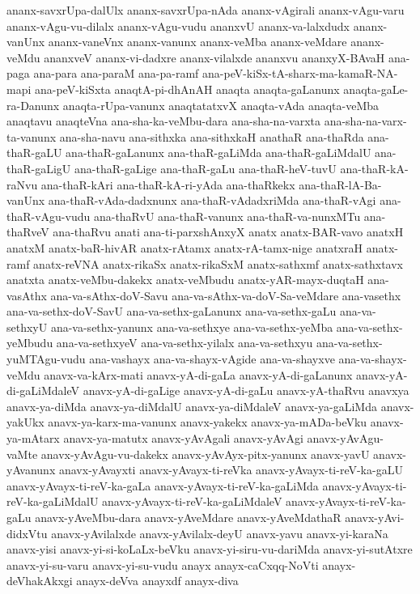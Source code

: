 {ananx-savxrUpa-dalUlx
ananx-savxrUpa-nAda
ananx-vAgirali
ananx-vAgu-varu
ananx-vAgu-vu-dilalx
ananx-vAgu-vudu
ananxvU
ananx-va-lalxdudx
ananx-vanUnx
ananx-vaneVnx
ananx-vanunx
ananx-veMba
ananx-veMdare
ananx-veMdu
ananxveV
ananx-vi-dadxre
ananx-vilalxde
ananxvu
ananxyX-BAvaH
ana-paga
ana-para
ana-paraM
ana-pa-ramf
ana-peV-kiSx-tA-sharx-ma-kamaR-NA-mapi
ana-peV-kiSxta
anaqtA-pi-dhAnAH
anaqta
anaqta-gaLanunx
anaqta-gaLe-ra-Danunx
anaqta-rUpa-vanunx
anaqtatatxvX
anaqta-vAda
anaqta-veMba
anaqtavu
anaqteVna
ana-sha-ka-veMbu-dara
ana-sha-na-varxta
ana-sha-na-varx-ta-vanunx
ana-sha-navu
ana-sithxka
ana-sithxkaH
anathaR
ana-thaRda
ana-thaR-gaLU
ana-thaR-gaLanunx
ana-thaR-gaLiMda
ana-thaR-gaLiMdalU
ana-thaR-gaLigU
ana-thaR-gaLige
ana-thaR-gaLu
ana-thaR-heV-tuvU
ana-thaR-kA-raNvu
ana-thaR-kAri
ana-thaR-kA-ri-yAda
ana-thaRkekx
ana-thaR-lA-Ba-vanUnx
ana-thaR-vAda-dadxnunx
ana-thaR-vAdadxriMda
ana-thaR-vAgi
ana-thaR-vAgu-vudu
ana-thaRvU
ana-thaR-vanunx
ana-thaR-va-nunxMTu
ana-thaRveV
ana-thaRvu
anati
ana-ti-parxshAnxyX
anatx
anatx-BAR-vavo
anatxH
anatxM
anatx-baR-hivAR
anatx-rAtamx
anatx-rA-tamx-nige
anatxraH
anatx-ramf
anatx-reVNA
anatx-rikaSx
anatx-rikaSxM
anatx-sathxmf
anatx-sathxtavx
anatxta
anatx-veMbu-dakekx
anatx-veMbudu
anatx-yAR-mayx-duqtaH
ana-vasAthx
ana-va-sAthx-doV-Savu
ana-va-sAthx-va-doV-Sa-veMdare
ana-vasethx
ana-va-sethx-doV-SavU
ana-va-sethx-gaLanunx
ana-va-sethx-gaLu
ana-va-sethxyU
ana-va-sethx-yanunx
ana-va-sethxye
ana-va-sethx-yeMba
ana-va-sethx-yeMbudu
ana-va-sethxyeV
ana-va-sethx-yilalx
ana-va-sethxyu
ana-va-sethx-yuMTAgu-vudu
ana-vashayx
ana-va-shayx-vAgide
ana-va-shayxve
ana-va-shayx-veMdu
anavx-va-kArx-mati
anavx-yA-di-gaLa
anavx-yA-di-gaLanunx
anavx-yA-di-gaLiMdaleV
anavx-yA-di-gaLige
anavx-yA-di-gaLu
anavx-yA-thaRvu
anavxya
anavx-ya-diMda
anavx-ya-diMdalU
anavx-ya-diMdaleV
anavx-ya-gaLiMda
anavx-yakUkx
anavx-ya-karx-ma-vanunx
anavx-yakekx
anavx-ya-mADa-beVku
anavx-ya-mAtarx
anavx-ya-matutx
anavx-yAvAgali
anavx-yAvAgi
anavx-yAvAgu-vaMte
anavx-yAvAgu-vu-dakekx
anavx-yAvAyx-pitx-yanunx
anavx-yavU
anavx-yAvanunx
anavx-yAvayxti
anavx-yAvayx-ti-reVka
anavx-yAvayx-ti-reV-ka-gaLU
anavx-yAvayx-ti-reV-ka-gaLa
anavx-yAvayx-ti-reV-ka-gaLiMda
anavx-yAvayx-ti-reV-ka-gaLiMdalU
anavx-yAvayx-ti-reV-ka-gaLiMdaleV
anavx-yAvayx-ti-reV-ka-gaLu
anavx-yAveMbu-dara
anavx-yAveMdare
anavx-yAveMdathaR
anavx-yAvi-didxVtu
anavx-yAvilalxde
anavx-yAvilalx-deyU
anavx-yavu
anavx-yi-karaNa
anavx-yisi
anavx-yi-si-koLaLx-beVku
anavx-yi-siru-vu-dariMda
anavx-yi-sutAtxre
anavx-yi-su-varu
anavx-yi-su-vudu
anayx
anayx-caCxqq-NoVti
anayx-deVhakAkxgi
anayx-deVva
anayxdf
anayx-diva
}
